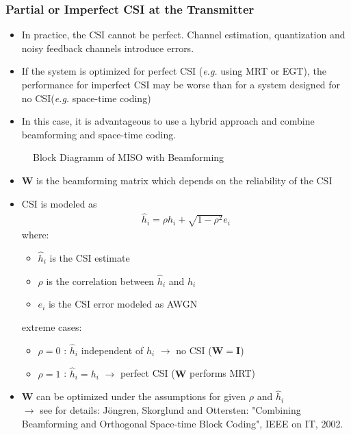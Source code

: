 \documentclass[a4paper, 10pt]{article}
\begin{document}
\subsubsection{Partial or Imperfect CSI at the Transmitter}
\begin{itemize}
	\item In practice, the CSI cannot be perfect. Channel estimation, quantization and noisy feedback channels introduce errors.
	\item If the system is optimized for perfect CSI (\textit{e.g.} using MRT or EGT), the performance for imperfect CSI may be worse than for a system designed for no CSI(\textit{e.g.} space-time coding)
	\item In this case, it is advantageous to use a hybrid approach and combine beamforming and space-time coding.
\end{itemize}
\begin{figure}[ht]
	\centering
	
	\caption{Block Diagramm of MISO with Beamforming}
	\label{fig:STBEAM.pstex_t}
\end{figure}
\begin{itemize}
	\item $\mathbf{W}$ is the beamforming matrix which depends on the reliability of the CSI
	\item CSI is modeled as
	\begin{align*}
	\hat{h}_i=\rho h_i+\sqrt{1-\rho^2}e_i
	\end{align*}
	where:
		\begin{itemize}
			\item $\hat{h}_i$ is the CSI estimate
			\item $\rho$ is the correlation between $\hat{h}_i$ and $h_i$
			\item $e_i$ is the CSI error modeled as AWGN
		\end{itemize}
	extreme cases:
		\begin{itemize}
			\item $\rho = 0$ : $\hat{h}_i$ independent of $h_i$ $\rightarrow$ no CSI ($\mathbf{W}=\mathbf{I}$)
			\item $\rho = 1$ : $\hat{h}_i=h_i$ $\rightarrow$ perfect CSI ($\mathbf{W}$ performs MRT)
		\end{itemize}
	\item $\mathbf{W}$ can be optimized under the assumptions for given $\rho$ and $\hat{h}_i$\\
	$\rightarrow$ see for details: J\"ongren, Skorglund and Ottersten: "Combining Beamforming and Orthogonal Space-time Block Coding", IEEE on IT, 2002.
\end{itemize}
\end{document}
